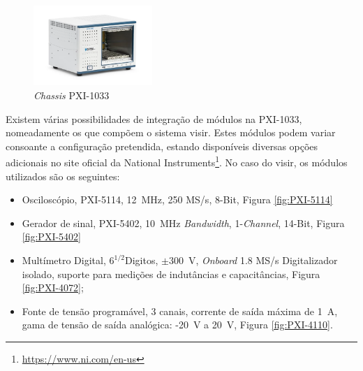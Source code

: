 \begin{figure}[hbtp]
    \centering
    \includegraphics[width=0.4\textwidth]{figures/PXI-1033.png}
    \caption{\textit{Chassis} PXI-1033 \cite{PXI-1033}}
    \label{fig:PXI-1033}
\end{figure}

Existem várias possibilidades de integração de módulos na PXI-1033, nomeadamente os que compõem o sistema \acrshort{visir}. Estes módulos podem variar consoante a configuração pretendida, estando disponíveis diversas opções adicionais no site oficial da National Instruments\footnote{\url{https://www.ni.com/en-us}}. No caso do \acrshort{visir}, os módulos utilizados são os seguintes:
\begin{itemize}
    \item Osciloscópio, PXI-5114, \SI{12}{\MHz}, 250 MS/s, 8-Bit, Figura \ref{fig:PXI-5114}
    \item Gerador de sinal, PXI-5402, \SI{10}{\MHz} \textit{Bandwidth}, 1-\textit{Channel}, 14-Bit, Figura \ref{fig:PXI-5402}  
    \item Multímetro Digital, \(6^{1/2} \)Digitos, \(\pm\)\SI{300}{\volt}, \textit{Onboard} 1.8 MS/s Digitalizador isolado, suporte para medições de indutâncias e capacitâncias, Figura \ref{fig:PXI-4072};
    \item Fonte de tensão programável, 3 canais, corrente de saída máxima de \SI{1}{\ampere}, gama de tensão de saída analógica: -\SI{20}{\volt} a \SI{20}{\volt}, Figura {\ref{fig:PXI-4110}}.
\end{itemize}

